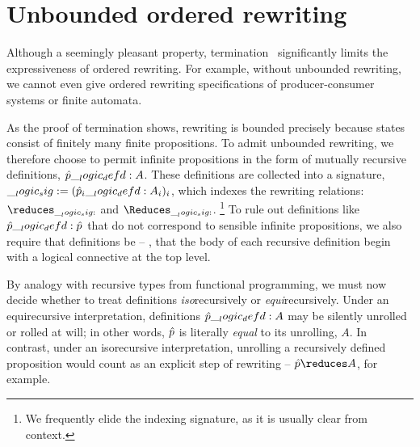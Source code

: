 \section{Unbounded ordered rewriting}

\autocite{Aranda+:FMCO06}

Although a seemingly pleasant property, termination~ significantly limits the expressiveness of ordered rewriting.
For example, without unbounded rewriting, we cannot even give ordered rewriting specifications of producer-consumer systems or finite automata.

As the proof of termination shows, rewriting is bounded
precisely because
states
consist of finitely many finite propositions.
To admit unbounded rewriting, we therefore choose to permit infinite propositions in the form of mutually recursive definitions, $\hat{p} \__logic_defd: A$.
These definitions are collected into a signature, $\__logic_sig: = (\hat{p}_i \__logic_defd: A_i)_i$, which indexes the rewriting relations: $\reduces_{\sig}$ and $\Reduces_{\sig}$.%
\footnote{We frequently elide the indexing signature, as it is usually clear from context.} 
To rule out definitions like $\hat{p} \__logic_defd: \hat{p}$ that do not correspond to sensible infinite propositions, we also require that definitions be \autocite{Gay+Hole:AI05} -- \ie, that the body of each recursive definition begin with a logical connective at the top level.

By analogy with recursive types from functional programming\autocite{??}, we must now decide whether to treat definitions \emph{iso}\-re\-cur\-sively or \emph{equi}\-re\-cur\-sively.
Under an equirecursive interpretation, definitions $\hat{p} \__logic_defd: A$ may be silently unrolled or rolled at will;
in other words, $\hat{p}$ is literally \emph{equal} to its unrolling, $A$.
In contrast, under an isorecursive interpretation, unrolling a recursively defined proposition would count as an explicit step of rewriting -- $\defp{p} \reduces A$, for example.

